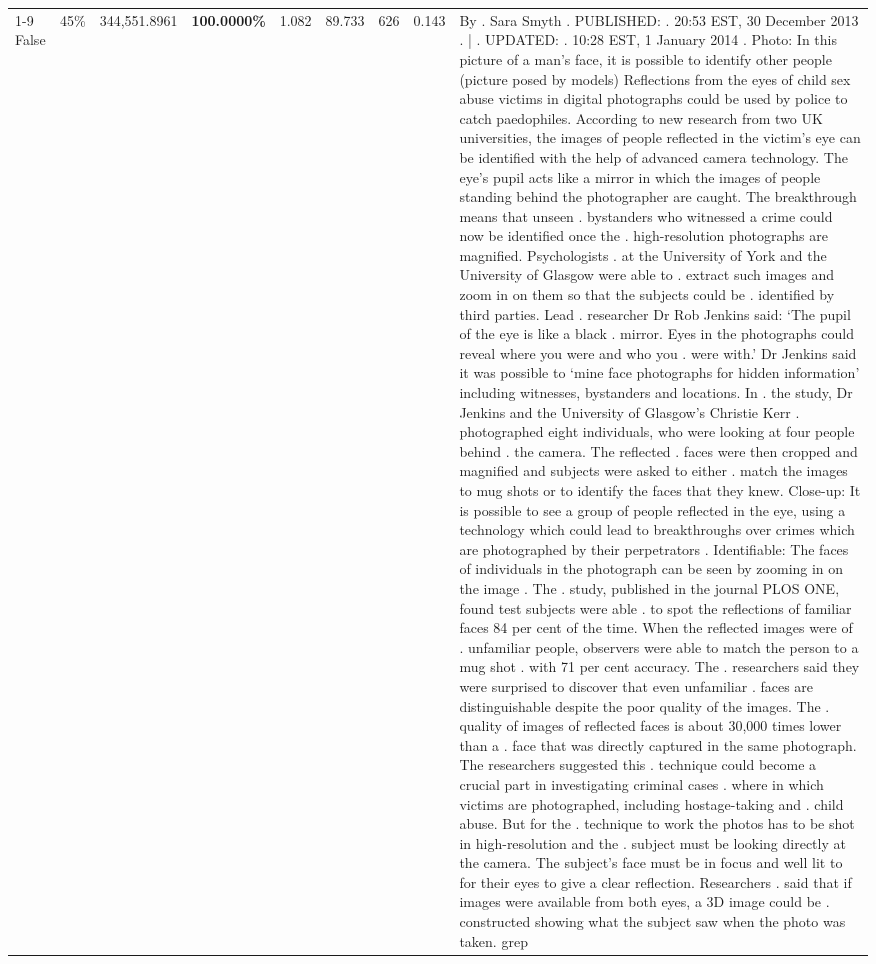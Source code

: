 \begin{table}[H]
\begin{tabular}{lllrlllll}
\cline{1-9} \cline{2-9}
False & 45\% & 344,551.8961 & \bfseries \color{red} 100.0000\% & 1.082 & 89.733 & 626 & 0.143 & By . Sara Smyth . PUBLISHED: . 20:53 EST, 30 December 2013 . | . UPDATED: . 10:28 EST, 1 January 2014 . Photo: In this picture of a man's face, it is possible to identify other people (picture posed by models) Reflections from the eyes of child sex abuse victims in digital photographs could be used by police to catch paedophiles. According to new research from two UK universities, the images of people reflected in the victim's eye can be identified with the help of advanced camera technology. The eye's pupil acts like a mirror in which the images of people standing behind the photographer are caught. The breakthrough means that unseen . bystanders who witnessed a crime could now be identified once the . high-resolution photographs are magnified. Psychologists . at the University of York and the University of Glasgow were able to . extract such images and zoom in on them so that the subjects could be . identified by third parties. Lead . researcher Dr Rob Jenkins said: ‘The pupil of the eye is like a black . mirror. Eyes in the photographs could reveal where you were and who you . were with.' Dr Jenkins said it was possible to ‘mine face photographs for hidden information' including witnesses, bystanders and locations. In . the study, Dr Jenkins and the University of Glasgow's Christie Kerr . photographed eight individuals, who were looking at four people behind . the camera. The reflected . faces were then cropped and magnified and subjects were asked to either . match the images to mug shots or to identify the faces that they knew. Close-up: It is possible to see a group of people reflected in the eye, using a technology which could lead to breakthroughs over crimes which are photographed by their perpetrators . Identifiable: The faces of individuals in the photograph can be seen by zooming in on the image . The . study, published in the journal PLOS ONE, found test subjects were able . to spot the reflections of familiar faces 84 per cent of the time. When the reflected images were of . unfamiliar people, observers were able to match the person to a mug shot . with 71 per cent accuracy. The . researchers said they were surprised to discover that even unfamiliar . faces are distinguishable despite the poor quality of the images. The . quality of images of reflected faces is about 30,000 times lower than a . face that was directly captured in the same photograph. The researchers suggested this . technique could become a crucial part in investigating criminal cases . where in which victims are photographed, including hostage-taking and . child abuse. But for the . technique to work the photos has to be shot in high-resolution and the . subject must be looking directly at the camera. The subject's face must be in focus and well lit to for their eyes to give a clear reflection. Researchers . said that if images were available from both eyes, a 3D image could be . constructed showing what the subject saw when the photo was taken. grep \\

\end{tabular}
\end{table}
